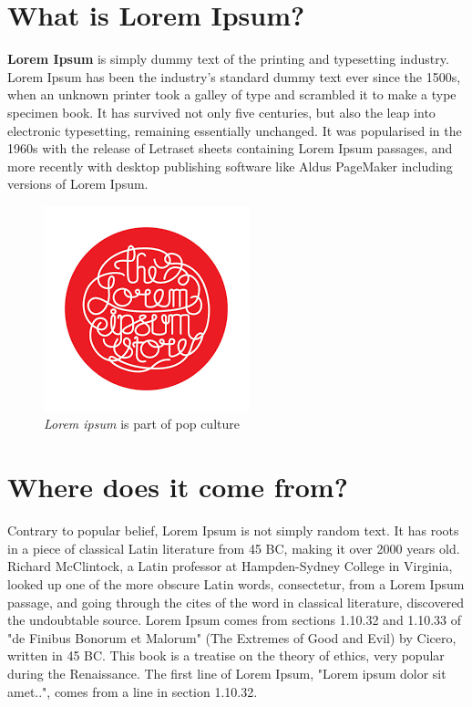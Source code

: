 \documentclass[12pt]{article}
\begin{document}
\begin{multicols}{2}
\section{What is Lorem Ipsum?}
\textbf{Lorem Ipsum} is simply dummy text of the printing and typesetting industry. Lorem Ipsum has been the industry's standard dummy text ever since the 1500s, when an unknown printer took a galley of type and scrambled it to make a type specimen book. It has survived not only five centuries, but also the leap into electronic typesetting, remaining essentially unchanged. It was popularised in the 1960s with the release of Letraset sheets containing Lorem Ipsum passages, and more recently with desktop publishing software like Aldus PageMaker including versions of Lorem Ipsum.

\begin{figure}[H] %
\centering
\includegraphics[width=0.5\linewidth]{ipsum_logo}
\caption[Shorter imagename]{\textit{Lorem ipsum} is part of pop culture\centering}
\end{figure}



\section{Where does it come from?}
Contrary to popular belief, Lorem Ipsum is not simply random text. It has roots in a piece of classical Latin literature from 45 BC, making it over 2000 years old. Richard McClintock, a Latin professor at Hampden-Sydney College in Virginia, looked up one of the more obscure Latin words, consectetur, from a Lorem Ipsum passage, and going through the cites of the word in classical literature, discovered the undoubtable source. Lorem Ipsum comes from sections 1.10.32 and 1.10.33 of "de Finibus Bonorum et Malorum" (The Extremes of Good and Evil) by Cicero, written in 45 BC. This book is a treatise on the theory of ethics, very popular during the Renaissance. The first line of Lorem Ipsum, "Lorem ipsum dolor sit amet..", comes from a line in section 1.10.32.


\end{multicols}
\end{document}
